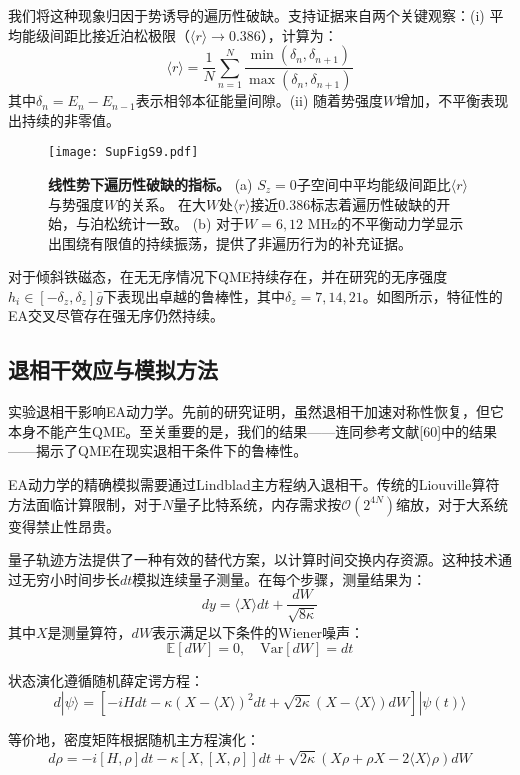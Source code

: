 \documentclass[11pt,a4paper]{article}
\begin{document}
我们将这种现象归因于势诱导的遍历性破缺。支持证据来自两个关键观察：(i) 平均能级间距比接近泊松极限（$\langle r\rangle \rightarrow 0.386$），计算为：
\[
\langle r\rangle = \frac{1}{N}\sum_{n=1}^{N} \frac{\min(\delta_n,\delta_{n+1})}{\max(\delta_n,\delta_{n+1})}
\]
其中$\delta_n=E_n-E_{n-1}$表示相邻本征能量间隙。(ii) 随着势强度$W$增加，不平衡表现出持续的非零值。

\begin{figure}[H]
    \centering
    \texttt{[image: SupFigS9.pdf]}
    \caption{
        \textbf{线性势下遍历性破缺的指标。}
        (a) $S_z=0$子空间中平均能级间距比$\langle r\rangle$与势强度$W$的关系。
        在大$W$处$\langle r\rangle$接近$0.386$标志着遍历性破缺的开始，与泊松统计一致。
        (b) 对于$W=6,12$ MHz的不平衡动力学显示出围绕有限值的持续振荡，提供了非遍历行为的补充证据。
    }
    \label{fig:ergodicity_breaking}
\end{figure}

对于倾斜铁磁态，在无无序情况下QME持续存在，并在研究的无序强度$h_i\in[-\delta_z,\delta_z]\bar{g}$下表现出卓越的鲁棒性，其中$\delta_z=7,14,21$。如图所示，特征性的EA交叉尽管存在强无序仍然持续。

\subsection{退相干效应与模拟方法}

实验退相干影响EA动力学。先前的研究证明，虽然退相干加速对称性恢复，但它本身不能产生QME。至关重要的是，我们的结果——连同参考文献[60]中的结果——揭示了QME在现实退相干条件下的鲁棒性。

EA动力学的精确模拟需要通过Lindblad主方程纳入退相干。传统的Liouville算符方法面临计算限制，对于$N$量子比特系统，内存需求按$\mathcal{O}(2^{4N})$缩放，对于大系统变得禁止性昂贵。

量子轨迹方法提供了一种有效的替代方案，以计算时间交换内存资源。这种技术通过无穷小时间步长$dt$模拟连续量子测量。在每个步骤，测量结果为：
\[
dy = \langle X\rangle dt + \frac{dW}{\sqrt{8\kappa}}
\]
其中$X$是测量算符，$dW$表示满足以下条件的Wiener噪声：
\[
\mathbb{E}[dW] = 0, \quad \text{Var}[dW] = dt
\]

状态演化遵循随机薛定谔方程：
\[
d|\psi\rangle = \left[-iHdt - \kappa(X-\langle X\rangle)^2 dt + \sqrt{2\kappa}(X-\langle X\rangle)dW\right]|\psi(t)\rangle
\]

等价地，密度矩阵根据随机主方程演化：
\[
d\rho = -i[H,\rho]dt - \kappa[X,[X,\rho]]dt + \sqrt{2\kappa}\left(X\rho + \rho X - 2\langle X\rangle\rho\right)dW
\]
\end{document}
